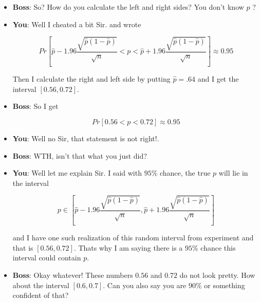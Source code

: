 \documentclass{beamer}\usepackage[]{graphicx}\usepackage[]{color}
\begin{document}
\begin{frame}[fragile]

\begin{itemize}

\item \textbf{Boss}: So? How do you calculate the left and right sides? You don't know $p$ ? \pause

\item \textbf{You}: Well I cheated a bit Sir. and wrote


$$ Pr \left [ \hat{p} - 1.96 \frac{\sqrt{\hat{p}(1-\hat{p})}}{\sqrt{n}} < p < \hat{p} + 1.96 \frac{\sqrt{\hat{p}(1-\hat{p})}}{\sqrt{n}}  \right ] \approx 0.95 $$ \pause

Then I calculate the right and left side by putting $\hat{p}=.64$ and I get the interval $ \left [ 0.56, 0.72 \right]$. \pause

\item \textbf{Boss}: So I get

$$ Pr [ 0.56 < p < 0.72 ] \approx 0.95 $$ \pause

\item \textbf{You}: Well no Sir, that statement is not right!.

\end{itemize}

\end{frame}

\begin{frame}[fragile]

\begin{itemize}

\item \textbf{Boss}: WTH, isn't that what you just did?  \pause

\item \textbf{You}: Well let me explain Sir. I said with $95 \%$ chance, the true $p$ will lie in the interval

$$ p \in \left [\hat{p} - 1.96 \frac{\sqrt{\hat{p}(1-\hat{p})}}{\sqrt{n}},  \hat{p} + 1.96 \frac{\sqrt{\hat{p}(1-\hat{p})}}{\sqrt{n}} \right] $$ \pause

and I have one such realization of this random interval from experiment and that is $\left [ 0.56, 0.72 \right]$. Thats why I am saying there is a $95 \%$ chance this interval could contain $p$.  \pause

\item \textbf{Boss}: Okay whatever! These numbers $ 0.56 $ and $ 0.72 $ do not look pretty. How about the interval $ \left [ 0.6, 0.7 \right]$. Can you also say you are $ 90\% $ or something confident of that?  \pause

\end{itemize}

\end{frame}
\end{document}
